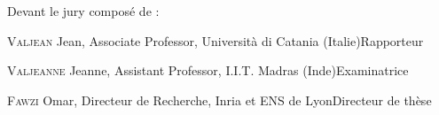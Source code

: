 \documentclass[11pt,a4paper]{book}
\begin{document}
\fontsize{12pt}{14pt}\selectfont
Devant le jury composé de :
\bigskip

\fontsize{11pt}{13pt}\selectfont



\textsc{Valjean} Jean, Associate Professor, Università di Catania (Italie)\hfill  Rapporteur

\medskip

\textsc{Valjeanne} Jeanne, Assistant Professor, I.I.T. Madras (Inde)\hfill Examinatrice

\bigskip

\textsc{Fawzi} Omar, Directeur de Recherche, Inria et ENS de Lyon\hfill Directeur de thèse



\newpage

\end{document}

